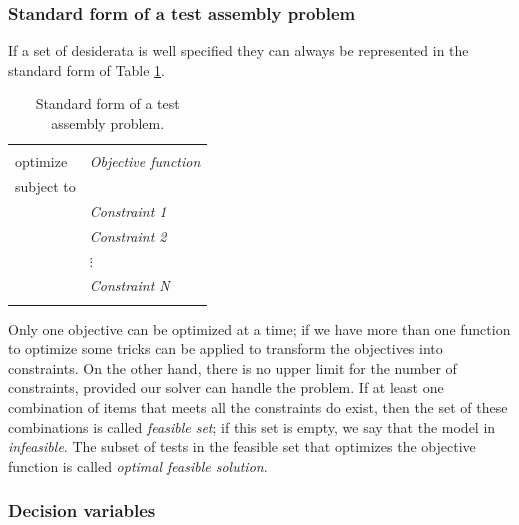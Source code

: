 \subsubsection{Standard form of a test assembly problem}

If a set of desiderata is well specified they can always be represented in the standard form of Table \ref{tab:stform}.
\begin{table}[H]
	\centering
	\begin{tabular}{|ll|}
		\hline    & \\
		optimize & \textit{Objective function} \\
		subject to & \\
		& \textit{Constraint 1} \\
		& \textit{Constraint 2} \\
		& $\vdots$ \\
		& \textit{Constraint N} \\
		& \\
		\hline
	\end{tabular}
	\caption{Standard form of a test assembly problem.}\label{tab:stform}
\end{table}

Only one objective can be optimized at a time; if we have more than one function to optimize some tricks can be applied to transform the objectives into constraints. On the other hand, there is no upper limit for the number of constraints, provided our solver can handle the problem. If at least one combination of items that meets all the constraints do exist, then the set of these combinations is called \emph{feasible set}; if this set is empty, we say that the model in \emph{infeasible}. The subset of tests in the feasible set that optimizes the objective function is called \emph{optimal feasible solution}.

\subsubsection{Decision variables}

